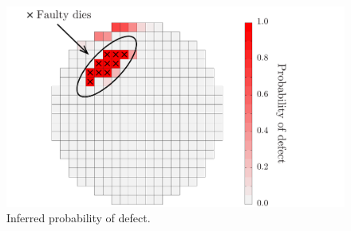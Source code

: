 \begin{figure}[b]
  \vspace{-1.5em}
  \centering
  \includegraphics[width=0.9\linewidth]{include/figures/wafer-defective.pdf}
  \caption{Inferred probability of defect.}
\end{figure}
